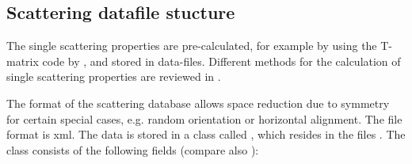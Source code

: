 \subsection{Scattering datafile stucture}
\label{sec:scattering:ARTS_SSP_structure}
 
The single scattering properties are pre-calculated, for example by
using the T-matrix 
code by \citet{Mishchenko:02}, and stored in data-files. Different
methods for the calculation of single scattering properties are
reviewed in \citet{emde05:_phdthesis}. 

The format of the scattering database allows space reduction due to
symmetry for certain special cases, e.g. random orientation or
horizontal alignment. The file format is xml. The data is stored in a
class called , which resides in
the files . The class consists of the
following 
fields (compare also ):

